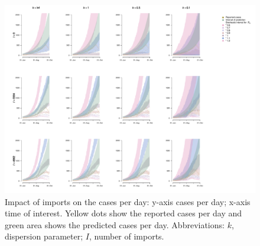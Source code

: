 \documentclass[10pt, a4paper, twoside]{article}
\begin{document}
\begin{multicols}{2}

\end{multicols}
\begin{figure}[h]
\centering
\includegraphics[scale=0.4]{sim3_cases_d_imports_infect_2021-02-24.pdf}
\caption{Impact of imports on the cases per day: y-axis cases per day; x-axis time of interest. Yellow dots show the reported cases per day and green area shows the predicted cases per day. Abbreviations: $k$, dispersion parameter; $I$, number of imports.}
\end{figure}
\end{document}
